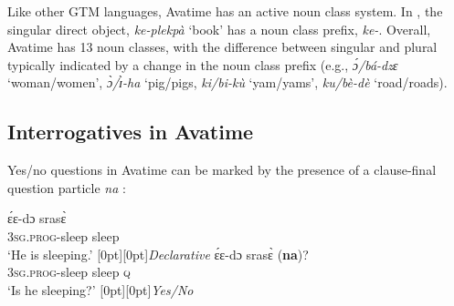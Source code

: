 \documentclass[output=paper]{langscibook}
\begin{document}
\begin{sloppypar}
Like other GTM languages, Avatime has an active noun class system.  In , the singular direct object, \textit{ke-plekp\`{a}} `book’ has a noun class prefix, \textit{ke-}.  Overall, Avatime has 13 noun classes, with the difference between singular and plural typically indicated by a change in the noun class prefix (e.g., \textit{\'{ɔ}/b\'{a}-dzɛ} `woman/women’, \textit{\`{ɔ}/\`{ɪ}-ha} `pig/pigs, \textit{ki/bi-k\`{u}} `yam/yams’, \textit{ku/b\`{e}-d\`{e}} `road/roads).
\end{sloppypar}

\subsection{Interrogatives in Avatime}
Yes/no questions in Avatime can be marked by the presence of a clause-final question particle \textit{na} \citep{ford:1971}:

\ea \label{ex:devlin:na-basic}
\begin{xlist}
\ex 
\gll \'{ɛɛ}-dɔ sras\`{ɛ}\\
\textsc{3sg}.\textsc{prog}-sleep sleep\\
\glt `He is sleeping.’ \hfill \raisebox{1.2\baselineskip}[0pt][0pt]{\textit{Declarative}}
\ex
\gll  \'{ɛɛ}-dɔ sras\`{ɛ} (\textbf{na})?\\
\textsc{3sg}.\textsc{prog}-sleep sleep \textsc{q}\\
\glt `Is he sleeping?’ \hfill \raisebox{1.2\baselineskip}[0pt][0pt]{\textit{Yes/No}}
\end{xlist}
\z
\end{document}
